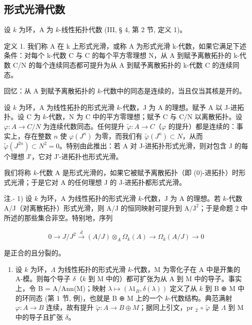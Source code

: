\subsection{形式光滑代数}

设 \(k\) 为环，A 为 \(k\)-线性拓扑代数 (III, § 4, 第 2 节, 定义 1)。

定义 1. 我们称 A 在 k 上形式光滑，或称 A 为形式光滑 k-代数，如果它满足下述条件：对每个 k-代数 C 与 C 的每个平方零理想 N，从 A 到赋予离散拓扑的 k-代数 C/N 的每个连续同态都可提升为从 A 到赋予离散拓扑的 k-代数 C 的连续同态。

回忆：从 A 到赋予离散拓扑的 \(k\)-代数中的同态是连续的，当且仅当其核是开的。

设 \(k\) 为环，A 为线性拓扑的形式光滑 \(k\)-代数，J 为 A 的理想。赋予 A 以 J-进拓扑。设 C 为 \(k\)-代数，N 为 C 中的平方零理想；赋予 C 与 C/N 以离散拓扑。设 \(\varphi : A \to C/N\) 为连续代数同态。任何提升 \(\tilde{\varphi} : A \to C\)（\(\varphi\) 的提升）都是连续的：事实上，存在整数 \(n\) 使 \(\varphi(J^n)\) 为零，而我们有 \(\tilde{\varphi}(J^n) \subset N\)，从而 \(\tilde{\varphi}(J^{2n}) \subset N^2 = 0\)。特别由此推出：若 A 对 J-进拓扑形式光滑，则对包含 J 的每个理想 J′，它对 J′-进拓扑也形式光滑。

我们将称 \(k\)-代数 A 是形式光滑的，如果它被赋予离散拓扑（即 (0)-进拓扑）时形式光滑；于是它对 A 的任何理想 J 的 J-进拓扑都形式光滑。

注.- 1) 设 \(k\) 为环，A 为线性拓扑的形式光滑 \(k\)-代数，J 为 A 的理想。若 \(k\)-代数 A/J（对离散拓扑）形式光滑，则 A/J 的恒同映射可提升到 \(\mathrm{A} / \mathrm{J}^2\)；于是命题 2 中所述的那些集合非空。特别地，序列

\[
0 \to J / J ^ {2} \xrightarrow {\bar {d}} (A / J) \otimes_ {A} \Omega_ {k} (A) \longrightarrow \Omega_ {k} (A / J) \to 0
\]

是正合的且分裂的。

\begin{enumerate}
\def\labelenumi{\arabic{enumi})}
\setcounter{enumi}{1}
\tightlist
\item
  设 \(k\) 为环，\(\Lambda\) 为线性拓扑的形式光滑 \(k\)-代数，M 为零化子在 A 中是开集的 A-模。则每个导子 \(\delta\)（\(k\) 到 M 中的）都可扩张为从 A 到 M 中的导子。事实上，令 B = A/Ann(M)；映射 \(\lambda \mapsto (\lambda 1_{B}, \delta(\lambda))\) 定义了从 \(k\) 到 B ⊕ M 中的环同态 (第 1 节, 例)，也就是 B ⊕ M 上的一个 \(k\)-代数结构。典范满射 \(\varphi: A \to B\) 连续，故有提升 \(\tilde{\varphi}: A \to B \oplus M\)；据同上引文，pr \(_{2}\) \(\circ\) \(\tilde{\varphi}\) 是 \(\Lambda\) 到 M 中的导子且扩张 \(\delta\)。
\end{enumerate}


